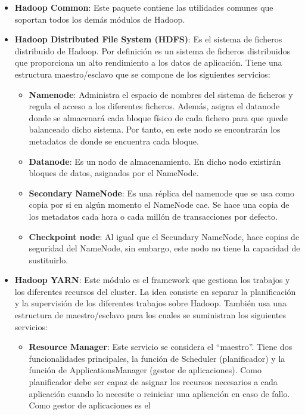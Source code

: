 \begin{itemize}
\item \textbf{Hadoop Common}: Este paquete contiene las utilidades comunes
  que soportan todos los demás módulos de Hadoop.
\item \textbf{Hadoop Distributed File System (HDFS)}: Es el sistema de
  ficheros distribuido de Hadoop. Por definición es un sistema de ficheros
  distribuidos que proporciona un alto rendimiento a los datos de
  aplicación. Tiene una estructura maestro/esclavo que se compone de los
  siguientes servicios:
  \begin{itemize}
  \item \textbf{Namenode}: Administra el espacio de nombres del sistema de
    ficheros y regula el acceso a los diferentes ficheros. Además, asigna
    el datanode donde se almacenará cada bloque físico de cada fichero para
    que quede balanceado dicho sistema. Por tanto, en este nodo se
    encontrarán los metadatos de donde se encuentra cada bloque.
  \item \textbf{Datanode}: Es un nodo de almacenamiento. En dicho nodo
    existirán bloques de datos, asignados por el NameNode.
  \item \textbf{Secondary NameNode}: Es una réplica del namenode que se usa
    como copia por si en algún momento el NameNode cae. Se hace una copia
    de los metadatos cada hora o cada millón de transacciones por defecto.
  \item \textbf{Checkpoint node}: Al igual que el Secundary NameNode, hace
    copias de seguridad del NameNode, sin embargo, este nodo no tiene la
    capacidad de sustituirlo.
  \end{itemize}
\item \textbf{Hadoop YARN}: Este módulo es el framework que gestiona los
  trabajos y los diferentes recursos del cluster. La idea consiste en
  separar la planificación y la supervisión de los diferentes trabajos
  sobre Hadoop. También usa una estructura de maestro/esclavo para los
  cuales se suministran los siguientes servicios:
  \begin{itemize}
  \item \textbf{Resource Manager}: Este servicio se considera el “maestro”.
    Tiene dos funcionalidades principales, la función de Scheduler
    (planificador) y la función de ApplicationsManager (gestor de
    aplicaciones). Como planificador debe ser capaz de asignar los recursos
    necesarios a cada aplicación cuando lo necesite o reiniciar una
    aplicación en caso de fallo. Como gestor de aplicaciones es el

\end{itemize}
\end{itemize}
